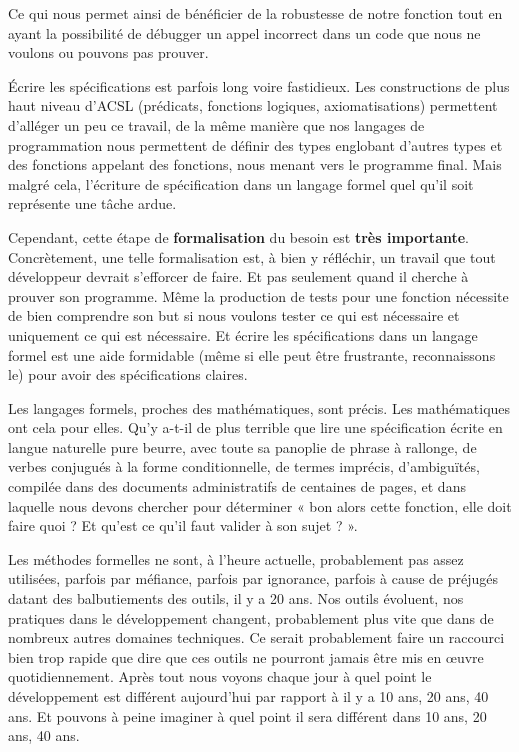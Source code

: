 Ce qui nous permet ainsi de bénéficier de la robustesse de notre fonction tout en
ayant la possibilité de débugger un appel incorrect dans un code que nous ne 
voulons ou pouvons pas prouver.



Écrire les spécifications est parfois long voire fastidieux. Les constructions 
de plus haut niveau d'ACSL (prédicats, fonctions logiques, axiomatisations) 
permettent d'alléger un peu ce travail, de la même manière que nos langages de
programmation nous permettent de définir des types englobant d'autres types et
des fonctions appelant des fonctions, nous menant vers le programme final. Mais
malgré cela, l'écriture de spécification dans un langage formel quel qu'il soit
représente une tâche ardue.



Cependant, cette étape de \textbf{formalisation} du besoin est \textbf{très importante}. 
Concrètement, une telle formalisation est, à bien y réfléchir, un travail que 
tout développeur devrait s'efforcer de faire. Et pas seulement quand il cherche 
à prouver son programme. Même la production de tests pour une fonction 
nécessite de bien comprendre son but si nous voulons tester ce qui est nécessaire 
et uniquement ce qui est nécessaire. Et écrire les spécifications dans un 
langage formel est une aide formidable (même si elle peut être frustrante, 
reconnaissons le) pour avoir des spécifications claires.



Les langages formels, proches des mathématiques, sont précis. Les mathématiques
ont cela pour elles. Qu'y a-t-il de plus terrible que lire une spécification 
écrite en langue naturelle pure beurre, avec toute sa panoplie de phrase à 
rallonge, de verbes conjugués à la forme conditionnelle, de termes imprécis, 
d'ambiguïtés, compilée dans des documents administratifs de centaines de pages,
et dans laquelle nous devons chercher pour déterminer « bon alors cette fonction, 
elle doit faire quoi ? Et qu'est ce qu'il faut valider à son sujet ? ».



Les méthodes formelles ne sont, à l'heure actuelle, probablement pas assez 
utilisées, parfois par méfiance, parfois par ignorance, parfois à cause de 
préjugés datant des balbutiements des outils, il y a 20 ans. Nos outils
évoluent, nos pratiques dans le développement changent, probablement plus
vite que dans de nombreux autres domaines techniques. Ce serait probablement
faire un raccourci bien trop rapide que dire que ces outils ne pourront 
jamais être mis en œuvre quotidiennement. Après tout nous voyons chaque jour
à quel point le développement est différent aujourd'hui par rapport à il y a
10 ans, 20 ans, 40 ans. Et pouvons à peine imaginer à quel point il sera 
différent dans 10 ans, 20 ans, 40 ans.



